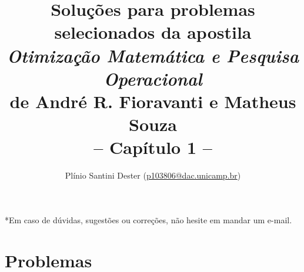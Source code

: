 


\title{	%
		{\Large Soluções para problemas selecionados da apostila\\[-0mm]
        \textit{Otimização Matemática e Pesquisa Operacional}\\[-2mm]
        de André R. Fioravanti e Matheus Souza}\\[2mm]
        -- Capítulo 1 --
}
\author{Plínio Santini Dester (\url{p103806@dac.unicamp.br})}



\maketitle

*Em caso de dúvidas, sugestões ou correções, não hesite em mandar um e-mail.

\setcounter{section}{0}
\section{Problemas}

\newpage

% 


